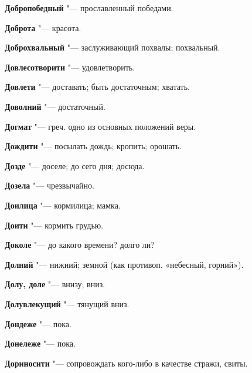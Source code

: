 \begin{mymulticols}{2}
\noindent\textbf{Добропобедный} "--- прославленный победами. 




\noindent\textbf{Доброта} "--- красота. 




\noindent\textbf{Доброхвальный} "--- заслуживающий похвалы; похвальный. 




\noindent\textbf{Довлесотворити} "--- удовлетворить. 




\noindent\textbf{Довлети} "--- доставать; быть достаточным; хватать. 




\noindent\textbf{Доволний} "--- достаточный. 




\noindent\textbf{Догмат} "--- греч. одно из основных положений веры. 




\noindent\textbf{Дождити} "--- посылать дождь; кропить; орошать. 




\noindent\textbf{Дозде} "--- доселе; до сего дня; досюда. 




\noindent\textbf{Дозела} "--- чрезвычайно. 




\noindent\textbf{Доилица} "--- кормилица; мамка. 




\noindent\textbf{Доити} "--- кормить грудью. 




\noindent\textbf{Доколе} "--- до какого времени? долго ли? 




\noindent\textbf{Долний} "--- нижний; земной (как противоп. «небесный, горний»). 




\noindent\textbf{Долу, доле} "--- внизу; вниз. 




\noindent\textbf{Долувлекущий} "--- тянущий вниз. 




\noindent\textbf{Дондеже} "--- пока. 




\noindent\textbf{Донележе} "--- пока. 




\noindent\textbf{Дориносити} "--- сопровождать кого-либо в качестве стражи, свиты. 





\end{mymulticols}
